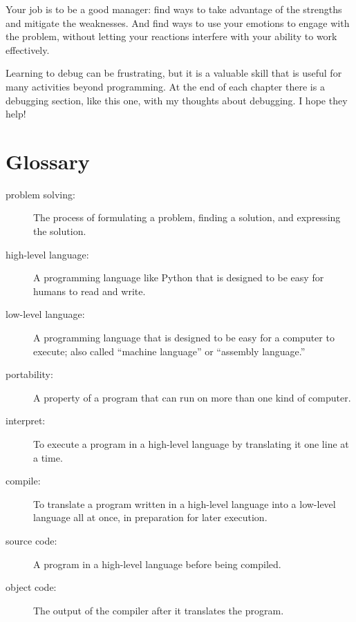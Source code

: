 \documentclass[10pt]{book}
\begin{document}
Your job is to be a good manager: find ways to take advantage
of the strengths and mitigate the weaknesses.  And find ways
to use your emotions to engage with the problem,
without letting your reactions interfere with your ability
to work effectively.

Learning to debug can be frustrating, but it is a valuable skill
that is useful for many activities beyond programming.  At the
end of each chapter there is a debugging section, like this one,
with my thoughts about debugging.  I hope they help!


\section{Glossary}

\begin{description}

\item[problem solving:]  The process of formulating a problem, finding
a solution, and expressing the solution.

\item[high-level language:]  A programming language like Python that
is designed to be easy for humans to read and write.

\item[low-level language:]  A programming language that is designed
to be easy for a computer to execute; also called ``machine language'' or
``assembly language.''

\item[portability:]  A property of a program that can run on more
than one kind of computer.

\item[interpret:]  To execute a program in a high-level language
by translating it one line at a time.

\item[compile:]  To translate a program written in a high-level language
into a low-level language all at once, in preparation for later
execution.

\item[source code:]  A program in a high-level language before
being compiled.

\item[object code:]  The output of the compiler after it translates
the program.


\end{description}
\end{document}

